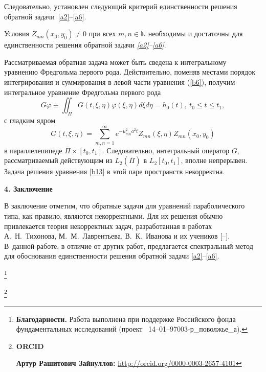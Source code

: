Следовательно, установлен следующий критерий единственности решения обратной задачи~\eqref{a2}--\eqref{a6}.

\smallskip

\begin{theorem}[4] Условия $Z_{mn}(x_0,y_0)\neq0$ при всех $m,n\in\mathbb{N}$ необходимы и достаточны для единственности решения обратной задачи {\em\eqref{a2}--\eqref{a6}}.
\end{theorem}

\smallskip

Рассматриваемая обратная задача может быть сведена к интегральному уравнению Фредгольма первого рода. Действительно, поменяв местами порядок интегрирования и суммирования в левой части уравнения (\ref{b6}), получим интегральное уравнение Фредгольма первого рода
\begin{equation}
\label{b13}
G\varphi\equiv\iint_{\Pi}G(t,\xi,\eta)\varphi(\xi,\eta)d\xi d\eta=h_0(t),\ t_0\leqslant t\leqslant t_1,\end{equation}
с гладким ядром
\begin{equation}
G(t,\xi,\eta)=\sum_{m,n=1}^{\infty} e^{-\mu_{mn}^2a^2t}Z_{mn}(\xi,\eta)Z_{mn}(x_0,y_0)
\end{equation}
в параллелепипеде $\overline{\Pi}\times[t_0,t_1]$. 
Следовательно, интегральный оператор $G$, рассматриваемый действующим из $L_2(\overline{\Pi})$ в $L_2[t_0,t_1]$, вполне непрерывен. 
Задача решения уравнения \eqref{b13} в этой паре пространств некорректна.

\smallskip

{\bf 4. Заключение}

В заключение отметим, что обратные задачи для уравнений параболического типа, как правило, являются некорректными. 
Для их решения обычно привлекается теория некорректных задач, разработанная в работах А.~Н.~Тихонова, М.~М.~Лаврентьева, В.~К.~Иванова и их учеников [--]. 
В~данной работе, в отличие от других работ, предлагается спектральный метод для обоснования единственности решения обратной задачи \eqref{a2}--\eqref{a6}. %



\thanks{\textbf{Благодарности.} 
Работа выполнена при поддержке Российского фонда фундаментальных исследований  (проект \No~14--01--97003-р\_поволжье\_а).}


\thanks{{\bf ORCID}

{\bf Артур Рашитович Зайнуллов:}    \url{http://orcid.org/0000-0003-2657-4101}



}


